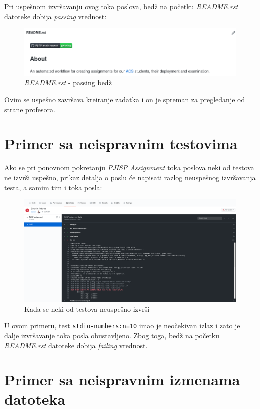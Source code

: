 \documentclass[12pt]{report}
\begin{document}
Pri uspešnom izvršavanju ovog toka poslova, bedž na početku \textit{README.rst} datoteke dobija \textit{passing} vrednost:

\begin{figure}[H]
    \centering
    \includegraphics[width=\linewidth]{images/14.png}
    \caption{\textit{README.rst} - passing bedž}
\end{figure}

Ovim se uspešno završava kreiranje zadatka i on je spreman za pregledanje od strane profesora.

\section{Primer sa neispravnim testovima}

Ako se pri ponovnom pokretanju \textit{PJISP Assignment} toka poslova neki od testova ne izvrši uspešno, prikaz detalja o poslu će napisati razlog neuspešnog izvršavanja testa, a samim tim i toka posla:

\begin{figure}[H]
    \centering
    \includegraphics[width=\linewidth]{images/15.png}
    \caption{Kada se neki od testova neuspešno izvrši}
\end{figure}

U ovom primeru, test \texttt{stdio-numbers:n=10} imao je neočekivan izlaz i zato je dalje izvršavanje toka posla obustavljeno. Zbog toga, bedž na početku \textit{README.rst} datoteke dobija \textit{failing} vrednost.

\section{Primer sa neispravnim izmenama datoteka}
\end{document}
